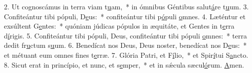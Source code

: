 2. Ut cognoscámus in terra viam t\uline{u}am,~* in ómnibus Géntibus salut\uline{á}re t\uline{u}um.
3. Confiteántur tibi pópuli, D\uline{e}us:~* confiteántur tibi p\uline{ó}puli \uline{o}mnes.
4. Læténtur et exsúltent G\uline{e}ntes:~* quóniam júdicas pópulos in æquitáte, et Gentes in t\uline{e}rra d\uline{í}rigis.
5. Confiteántur tibi pópuli, Deus, confiteántur tibi pópuli \uline{o}mnes:~* terra dedit fr\uline{u}ctum s\uline{u}um.
6. Benedícat nos Deus, Deus noster, benedícat nos D\uline{e}us:~* et métuant eum omnes f\uline{i}nes t\uline{e}rræ.
7. Glória Patri, et F\uline{í}lio,~* et Spir\uline{í}tui S\uline{a}ncto.
8. Sicut erat in princípio, et nunc, et s\uline{e}mper,~* et in sǽcula sæcul\uline{ó}rum. \uline{A}men.
